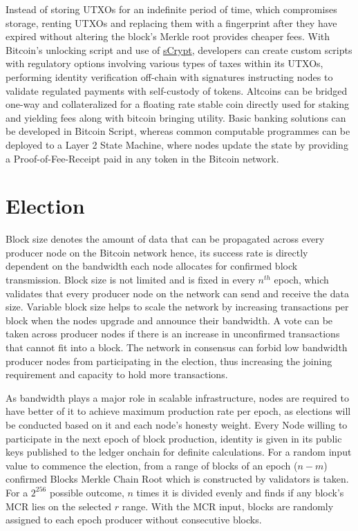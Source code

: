 \documentclass[a4paper,10pt]{article}
\begin{document}
Instead of storing UTXOs for an indefinite period of time, which compromises storage, renting UTXOs and replacing them with a fingerprint after they have expired without altering the block’s Merkle root provides cheaper fees. With Bitcoin’s unlocking script and use of \href{https://scrypt.io}{sCrypt}, developers can create custom scripts with regulatory options involving various types of taxes within its UTXOs, performing identity verification off-chain with signatures instructing nodes to validate regulated payments with self-custody of tokens. Altcoins can be bridged one-way and collateralized for a floating rate stable coin directly used for staking and yielding fees along with bitcoin bringing utility. Basic banking solutions can be developed in Bitcoin Script, whereas common computable programmes can be deployed to a Layer 2 State Machine, where nodes update the state by providing a Proof-of-Fee-Receipt paid in any token in the Bitcoin network. 
\section{Election}
Block size denotes the amount of data that can be propagated across every producer node on the Bitcoin network hence, its success rate is directly dependent on the bandwidth each node allocates for confirmed block transmission. Block size is not limited and is fixed in every $n^{th}$ epoch, which validates that every producer node on the network can send and receive the data size. Variable block size helps to scale the network by increasing transactions per block when the nodes upgrade and announce their bandwidth. A vote can be taken across producer nodes if there is an increase in unconfirmed transactions that cannot fit into a block. The network in consensus can forbid low bandwidth producer nodes from participating in the election, thus increasing the joining requirement and capacity to hold more transactions.

As bandwidth plays a major role in scalable infrastructure, nodes are required to have better of it to achieve maximum production rate per epoch, as elections will be conducted based on it and each node's honesty weight. Every Node willing to participate in the next epoch of block production, identity is given in its public keys published to the ledger onchain for definite calculations. For a random input value to commence the election, from a range of blocks of an epoch ($n-m$) confirmed Blocks Merkle Chain Root which is constructed by validators is taken. For a $2^{256}$ possible outcome, $n$ times it is divided evenly and finds if any block's MCR lies on the selected $r$ range. With the MCR input, blocks are randomly assigned to each epoch producer without consecutive blocks. 
\end{document}
